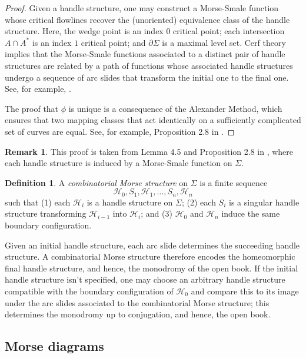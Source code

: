 \documentclass{amsart}
\theoremstyle{definition}
\newtheorem{definition}[theorem]{Definition}
\newtheorem{remark}[theorem]{Remark}
\def\H{\mathcal{H}}
\begin{document}
\begin{proof}  Given a handle structure, one may construct a Morse-Smale function whose critical flowlines  recover the (unoriented) equivalence class of the handle structure.  Here, the wedge point is an index $0$ critical point; each intersection $A\cap A^*$ is an index $1$ critical point; and $\partial \Sigma$ is a maximal level set.  Cerf theory implies that the Morse-Smale functions associated to a distinct pair of handle structures are related by a path of functions whose associated handle structures undergo a sequence of arc slides that transform the initial one to the final one.  See, for example, \cite{GK}.

The proof that $\phi$ is unique is a consequence of the Alexander Method, which ensures that two mapping classes that act identically on a sufficiently complicated set of curves are equal.  See, for example, Proposition 2.8 in \cite{FM}.
\end{proof}

\begin{remark} This proof is taken from  Lemma 4.5 and Proposition 2.8 in \cite{GL}, where each handle structure is induced by a Morse-Smale function on $\Sigma$.
\end{remark}


\begin{definition}
    A \emph{combinatorial Morse structure} on $\Sigma$ is a finite sequence  \[\H_0, S_1, \H_1, \dots, 
 S_n, \H_n\] such that (1) each $\H_i$ is a handle structure on $\Sigma$; (2) each $S_i$ is a singular handle structure transforming $\H_{i-1}$ into $\H_i$; and (3) $\H_0$ and $\H_n$ induce the same boundary configuration.
\end{definition}


Given an initial handle structure, each arc slide determines the succeeding handle structure.  A combinatorial Morse structure therefore encodes the homeomorphic final handle structure, and hence, the monodromy of the open book.   If the initial handle structure isn't specified, one may choose an arbitrary handle structure compatible with the boundary configuration of $\H_0$ and compare this to its image under the arc slides associated to  the combinatorial Morse structure; this determines the monodromy up to conjugation, and hence, the open book.





\subsection{Morse diagrams}
\end{document}
